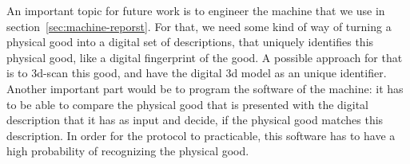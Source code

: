 \documentclass{cacthesis}
\begin{document}
An important topic for future work is to engineer the machine that we use in section~\ref{sec:machine-reporst}. For that, we need some kind of way of turning a physical good into a digital set of descriptions, that uniquely identifies this physical good, like a digital fingerprint of the good. A possible approach for that is to 3d-scan this good, and have the digital 3d model as an unique identifier. Another important part would be to program the software of the machine: it has to be able to compare the physical good that is presented with the digital description that it has as input and decide, if the physical good matches this description. In order for the protocol to practicable, this software has to have a high probability of recognizing the physical good.




	
	
	\printbibliography
	
	\appendix
\end{document}
